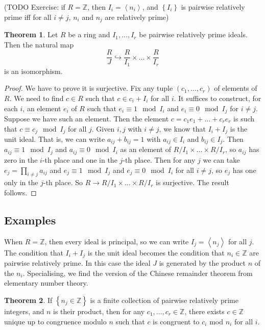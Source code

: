 \documentclass{article}
\newcommand{\Z}{\mathbb{Z}}
\newcommand{\rb}[1]{\left( #1 \right)}
\newcommand{\cb}[1]{\left\{ #1 \right\}}
\newcommand{\ab}[1]{\left\langle #1 \right\rangle}
\theoremstyle{definition}\newtheorem{definition}{Definition}[subsection]
\theoremstyle{definition}\newtheorem{remark}[definition]{Remark}
\theoremstyle{definition}\newtheorem*{example}{Example}
\theoremstyle{definition}\newtheorem*{note}{Note}
\newtheorem{theorem}[definition]{Theorem}
\begin{document}
(TODO Exercise: if $ R = \Z $, then $ I_i = \ab{n_i} $, and $ \cb{I_i} $ is pairwise relatively prime iff for all $ i \ne j $, $ n_i $ and $ n_j $ are relatively prime)

\begin{theorem}
Let $ R $ be a ring and $ I_1, \dots, I_r $ be pairwise relatively prime ideals. Then the natural map
$$ \dfrac{R}{J} \hookrightarrow \dfrac{R}{I_1} \times \dots \times \dfrac{R}{I_r} $$
is an isomorphism.
\end{theorem}

\begin{proof}
We have to prove it is surjective. Fix any tuple $ \rb{c_1, \dots, c_r} $ of elements of $ R $. We need to find $ c \in R $ such that $ c \in c_i + I_i $ for all $ i $. It suffices to construct, for each $ i $, an element $ e_i $ of $ R $ such that $ e_i \equiv 1 \mod I_i $ and $ e_i \equiv 0 \mod I_j $ for $ i \ne j $. Suppose we have such an element. Then the element $ c = c_1e_1 + \dots + c_re_r $ is such that $ c \equiv c_j \mod I_j $ for all $ j $. Given $ i, j $ with $ i \ne j $, we know that $ I_i + I_j $ is the unit ideal. That is, we can write $ a_{ij} + b_{ij} = 1 $ with $ a_{ij} \in I_i $ and $ b_{ij} \in I_j $. Then $ a_{ij} \equiv 1 \mod I_j $ and $ a_{ij} \equiv 0 \mod I_i $ as an element of $ R / I_1 \times \dots \times R / I_r $, so $ a_{ij} $ has zero in the $ i $-th place and one in the $ j $-th place. Then for any $ j $ we can take $ e_j = \prod_{i \ne j} a_{ij} $ and $ e_j \equiv 1 \mod I_j $ and $ e_j \equiv 0 \mod I_i $ for all $ i \ne j $, so $ e_j $ has one only in the $ j $-th place. So $ R \to R / I_1 \times \dots \times R / I_r $ is surjective. The result follows.
\end{proof}

\subsection{Examples}

When $ R = \Z $, then every ideal is principal, so we can write $ I_j = \ab{n_j} $ for all $ j $. The condition that $ I_i + I_j $ is the unit ideal becomes the condition that $ n_i \in \Z $ are pairwise relatively prime. In this case the ideal $ J $ is generated by the product $ n $ of the $ n_i $. Specialising, we find the version of the Chinese remainder theorem from elementary number theory.

\begin{theorem}
If $ \cb{n_j \in \Z} $ is a finite collection of pairwise relatively prime integers, and $ n $ is their product, then for any $ c_1, \dots, c_r \in \Z $, there exists $ c \in \Z $ unique up to congruence modulo $ n $ such that $ c $ is congruent to $ c_i $ mod $ n_i $ for all $ i $.
\end{theorem}
\end{document}
